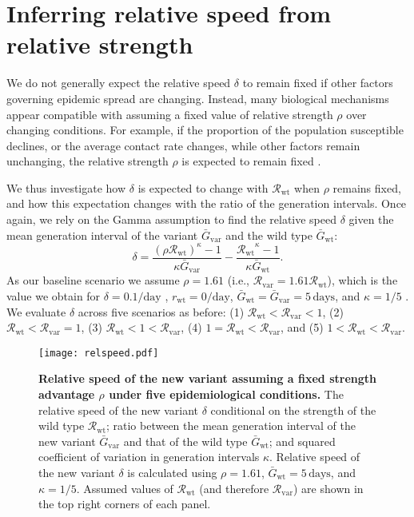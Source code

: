 \documentclass[12pt]{article}
\newcommand{\vvvar}{\mathrm{var}}
\newcommand{\wwwt}{\mathrm{wt}}
\newcommand{\rx}[1]{\ensuremath{{r}_{#1}}\xspace}
\newcommand{\rw}{\rx{\wwwt}}
\newcommand{\Rx}[1]{\ensuremath{{\mathcal R}_{#1}}\xspace}
\newcommand{\Rw}{\Rx{\wwwt}}
\newcommand{\Rv}{\Rx{\vvvar}}
\newcommand{\days}{\ensuremath{\, \textrm{days}}}
\newcommand{\pday}{\ensuremath{/\textrm{day}}}
\newcommand{\Gx}[1]{\ensuremath{{\bar G}_{#1}}\xspace}
\newcommand{\Gw}{\Gx{\wwwt}}
\newcommand{\Gv}{\Gx{\vvvar}}
\begin{document}
\section{Inferring relative speed from relative strength}

We do not generally expect the relative speed $\delta$ to remain fixed if other factors governing epidemic spread are changing.
Instead, many biological mechanisms appear compatible with assuming a fixed value of relative strength $\rho$ over changing conditions.
For example, if the proportion of the population susceptible declines, or the average contact rate changes, while other factors remain unchanging, the relative strength $\rho$ is expected to remain fixed \citep{leung2017monitoring,leung2020empirical,di2021impact,leung2021early}.

We thus investigate how $\delta$ is expected to change with \Rw when $\rho$ remains fixed, and how this expectation changes with the ratio of the generation intervals. 
Once again, we rely on the Gamma assumption \citep{park2019practical} to find the relative speed $\delta$ given the mean generation interval of the variant $\Gv$ and the wild type $\Gw$:
\begin{equation}
\delta = \frac{(\rho \Rw)^{\kappa} - 1}{\kappa \Gv} - \frac{\Rw^{\kappa} - 1}{\kappa \Gw}.
\end{equation}
As our baseline scenario we assume $\rho = 1.61$ (i.e., $\Rv = 1.61 \Rw$), which is the value we obtain for $\delta=0.1\pday$ \citep{davies2021estimated}, $\rw=0\pday$, $\Gw = \Gv = 5\,\textrm{days}$, and $\kappa = 1/5$ \citep{ferretti2020quantifying}.
We evaluate $\delta$ across five scenarios as before: (1) $\Rw < \Rv < 1$, (2) $\Rw < \Rv = 1$, (3) $\Rw < 1 < \Rv$, (4) $1 = \Rw < \Rv$, and (5) $1 < \Rw < \Rv$.

\begin{figure}[!th]
\texttt{[image: relspeed.pdf]}
\caption{
\textbf{Relative speed of the new variant assuming a fixed strength advantage $\rho$ under five epidemiological conditions.}
The relative speed of the new variant $\delta$ conditional on the strength of the wild type $\Rw$; ratio between the mean generation interval of the new variant $\Gv$ and that of the wild type $\Gw$; and squared coefficient of variation in generation intervals $\kappa$.
Relative speed of the new variant $\delta$ is calculated using $\rho=1.61$, $\Gw = 5\days$, and $\kappa = 1/5$.
Assumed values of $\Rw$ (and therefore $\Rv$) are shown in the top right corners of each panel.
}
\label{fig:relspeed}
\end{figure}
\end{document}
